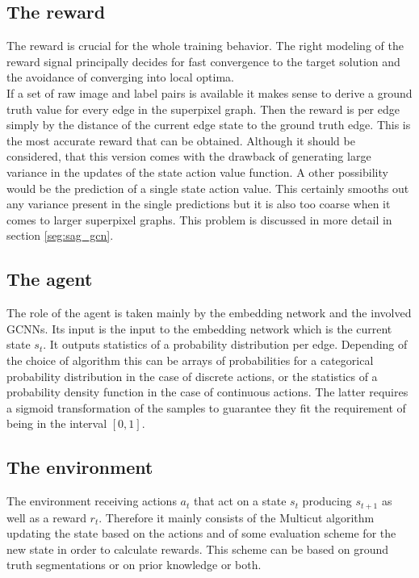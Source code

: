 \subsection{The reward}
The reward is crucial for the whole training behavior. The right modeling of the reward signal principally decides for fast convergence to the target solution and the avoidance of converging into local optima.\\
If a set of raw image and label pairs is available it makes sense to derive a ground truth value for every edge in the superpixel graph. Then the reward is per edge simply by the distance of the current edge state to the ground truth edge. This is the most accurate reward that can be obtained. Although it should be considered, that this version comes with the drawback of generating large variance in the updates of the state action value function. A other possibility would be the prediction of a single state action value. This certainly smooths out any variance present in the single predictions but it is also too coarse when it comes to larger superpixel graphs. This problem is discussed in more detail in section \ref{seg:sag_gcn}.

\subsection{The agent}
The role of the agent is taken mainly by the embedding network and the involved GCNNs. Its input is the input to the embedding network which is the current state $s_t$. It outputs statistics of a probability distribution per edge. Depending of the choice of algorithm this can be arrays of probabilities for a categorical probability distribution in the case of discrete actions, or the statistics of a probability density function in the case of continuous actions. The latter requires a sigmoid transformation of the samples to guarantee they fit the requirement of being in the interval $[0,1]$.

\subsection{The environment}
The environment receiving actions $a_t$ that act on a state $s_t$ producing $s_{t+1}$ as well as a reward $r_t$. Therefore it mainly consists of the Multicut algorithm updating the state based on the actions and of some evaluation scheme for the new state in order to calculate rewards. This scheme can be based on ground truth segmentations or on prior knowledge or both.

